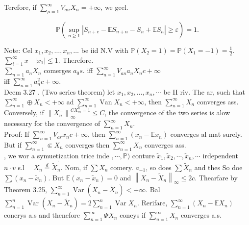 \documentclass{amsbook}
\theoremstyle{plain}%
\theoremstyle{definition}
\theoremstyle{remark}
\begin{document}
Terefore, if $\sum_{\mu=1}^{\infty} V_{a n} X_{n}=+\infty$, we geel.

$$
\mathbb{P}\left(\sup _{n \geqslant 1}\left|S_{n+e}-\mathbb{E} S_{n+n}-S_{n}+\mathbb{E} S_{n}\right| \geqslant \varepsilon\right)=1 .
$$

Note: Cel $x_{1}, x_{2}, \ldots, x_{n}, \ldots$ be iid N.V with $\mathbb{P}\left(X_{2}=1\right)=\mathbb{P}\left(X_{1}=-1\right)=\frac{1}{2}$.\\
$\sum_{i=1}^{\infty} x \quad\left|x_{1}\right| \leqslant 1$. Therefore.\\
$\sum_{n=1} a_{n} X_{n}$ comerges $a_{0} s$. iff $\sum_{n=1}^{\infty} V_{a n} a_{n} X_{n} c+\infty$\\
iff $\sum_{n=1}^{\infty} a_{n}^{2} c+\infty$.\\
Deem 3.27 . (Two series theorem) let $x_{1}, x_{2}, \ldots, x_{n}, \cdots$ be II riv. The ar, such that $\sum_{n=1}^{\infty} \oplus X_{n}<+\infty$ ad $\sum_{n=1}^{\infty} \operatorname{Van} X_{n}<+\infty$, then $\sum_{n=1}^{\infty} X_{n}$ converges ass. Conversely, if $\left\|X_{n}^{-}\right\|_{\infty}^{C X_{m}^{n}=1} \leq C$, the convergence of the two series is alow necessary for the convergence of $\sum_{n=1}^{\infty} X_{n}$.\\
Proof: If $\sum_{n=1}^{\infty} V_{a r} x_{n} c+\infty$, then $\sum_{n=1}^{\infty}\left(x_{n}-\mathbb{E} x_{n}\right)$ converges al mat surely. But if $\sum_{n=1}^{\infty} \Subset X_{n}$ converges then $\sum_{n=1}^{\infty} X_{n}$ converges ass.\\
, we wor a symuetization trice inde $, \cdots, \mathbb{P})$ conture $\tilde{x}_{1}, \tilde{x}_{2}, \cdots, \tilde{x}_{n}, \cdots$ irdependent $n \cdot v$ s.l $\quad X_{n} \stackrel{d}{=} \tilde{X}_{n}^{\prime}$. Nom, if $\sum X_{n}$ comery. $a_{-1}$, so does $\sum \tilde{X}_{n}$ and thes So doe $\sum\left(x_{n}-\tilde{x}_{n}\right)$. But $\mathbb{E}\left(x_{n}-\tilde{x}_{n}\right)=0$ and $\left\|X_{n}-\tilde{X}_{n}\right\|_{\infty} \leqslant 2 c$. Thearfare by Theorem 3.25, $\sum_{n=1}^{\infty} \operatorname{Var}\left(X_{n}-\tilde{X}_{n}\right)<+\infty$. Bal $\sum_{n=1}^{n} \operatorname{Var}\left(X_{n}-\tilde{X}_{n}\right)=2 \sum_{n=1}^{n} \operatorname{Var} X_{n}$. Rerifare, $\sum_{n=1}^{\infty}\left(X_{n}-\mathbb{E} X_{n}\right)$ conerys a.s and thenefore $\sum_{n=1}^{\infty} \Phi X_{n}$ coneys if $\sum_{n=1}^{\infty} X_{n}$ converges a.s.
\end{document}
